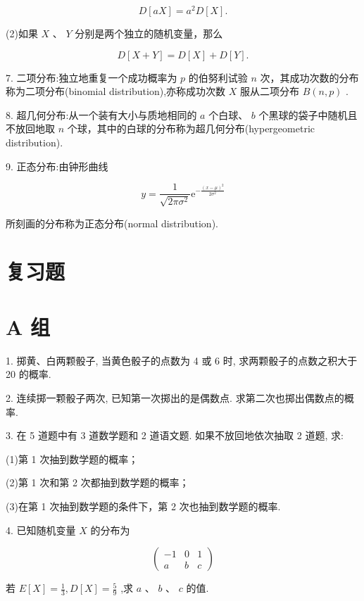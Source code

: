 \documentclass[10pt]{article}
\begin{document}
\[
D\left\lbrack  {aX}\right\rbrack   = {a}^{2}D\left\lbrack  X\right\rbrack  .
\]

(2)如果 \(X\) 、 \(Y\) 分别是两个独立的随机变量，那么

\[
D\left\lbrack  {X + Y}\right\rbrack   = D\left\lbrack  X\right\rbrack   + D\left\lbrack  Y\right\rbrack  .
\]

7. 二项分布:独立地重复一个成功概率为 \(p\) 的伯努利试验 \(n\) 次，其成功次数的分布称为二项分布(binomial distribution),亦称成功次数 \(X\) 服从二项分布 \(B\left( {n,p}\right)\) .

8. 超几何分布:从一个装有大小与质地相同的 \(a\) 个白球、 \(b\) 个黑球的袋子中随机且不放回地取 \(n\) 个球，其中的白球的分布称为超几何分布(hypergeometric distribution).

9. 正态分布:由钟形曲线

\[
y = \frac{1}{\sqrt{{2\pi }{\sigma }^{2}}}{\mathrm{e}}^{-\frac{{\left( x - \mu \right) }^{2}}{2{\sigma }^{2}}}
\]

所刻画的分布称为正态分布(normal distribution).

\section*{复习题}

\section*{A 组}

1. 掷黄、白两颗骰子, 当黄色骰子的点数为 4 或 6 时, 求两颗骰子的点数之积大于 20 的概率.

2. 连续掷一颗骰子两次, 已知第一次掷出的是偶数点. 求第二次也掷出偶数点的概率.

3. 在 5 道题中有 3 道数学题和 2 道语文题. 如果不放回地依次抽取 2 道题, 求:

(1)第 1 次抽到数学题的概率；

(2)第 1 次和第 2 次都抽到数学题的概率；

(3)在第 1 次抽到数学题的条件下，第 2 次也抽到数学题的概率.

4. 已知随机变量 \(X\) 的分布为

\[
\left( \begin{matrix}  - 1 & 0 & 1 \\  a & b & c \end{matrix}\right)
\]

若 \(E\left\lbrack  X\right\rbrack   = \frac{1}{3},D\left\lbrack  X\right\rbrack   = \frac{5}{9}\) ,求 \(a\text{ 、 }b\text{ 、 }c\) 的值.
\end{document}
